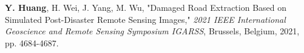 \textbf{Y. Huang}, H. Wei, J. Yang, M. Wu, "Damaged Road Extraction Based on Simulated Post-Disaster Remote Sensing Images," \textit{2021 IEEE International Geoscience and Remote Sensing Symposium IGARSS}, Brussels, Belgium, 2021, pp. 4684-4687.